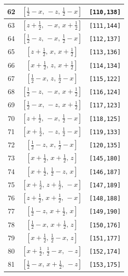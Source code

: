 \documentclass[fleqn,8pt]{jsarticle}
\begin{document}
\begin{longtable}{ccc}
62 & $\left[ \frac{1}{2} - x,\, - z,\, \frac{1}{2} - x \right]$ & {\tt [110,138]} \\ \hline
63 & $\left[ z + \frac{1}{2},\, - x,\, x + \frac{1}{2} \right]$ & {\tt [111,144]} \\ \hline
64 & $\left[ \frac{1}{2} - z,\, - x,\, \frac{1}{2} - x \right]$ & {\tt [112,137]} \\ \hline
65 & $\left[ z + \frac{1}{2},\, x,\, x + \frac{1}{2} \right]$ & {\tt [113,136]} \\ \hline
66 & $\left[ x + \frac{1}{2},\, z,\, x + \frac{1}{2} \right]$ & {\tt [114,134]} \\ \hline
67 & $\left[ \frac{1}{2} - x,\, z,\, \frac{1}{2} - x \right]$ & {\tt [115,122]} \\ \hline
68 & $\left[ \frac{1}{2} - z,\, - x,\, x + \frac{1}{2} \right]$ & {\tt [116,124]} \\ \hline
69 & $\left[ \frac{1}{2} - x,\, - z,\, x + \frac{1}{2} \right]$ & {\tt [117,123]} \\ \hline
70 & $\left[ z + \frac{1}{2},\, - x,\, \frac{1}{2} - x \right]$ & {\tt [118,125]} \\ \hline
71 & $\left[ x + \frac{1}{2},\, - z,\, \frac{1}{2} - x \right]$ & {\tt [119,133]} \\ \hline
72 & $\left[ \frac{1}{2} - z,\, x,\, \frac{1}{2} - x \right]$ & {\tt [120,135]} \\ \hline
73 & $\left[ x + \frac{1}{2},\, x + \frac{1}{2},\, z \right]$ & {\tt [145,180]} \\ \hline
74 & $\left[ x + \frac{1}{2},\, \frac{1}{2} - z,\, x \right]$ & {\tt [146,187]} \\ \hline
75 & $\left[ x + \frac{1}{2},\, z + \frac{1}{2},\, - x \right]$ & {\tt [147,189]} \\ \hline
76 & $\left[ z + \frac{1}{2},\, x + \frac{1}{2},\, - x \right]$ & {\tt [148,188]} \\ \hline
77 & $\left[ \frac{1}{2} - z,\, x + \frac{1}{2},\, x \right]$ & {\tt [149,190]} \\ \hline
78 & $\left[ \frac{1}{2} - x,\, x + \frac{1}{2},\, z \right]$ & {\tt [150,176]} \\ \hline
79 & $\left[ x + \frac{1}{2},\, \frac{1}{2} - x,\, z \right]$ & {\tt [151,177]} \\ \hline
80 & $\left[ x + \frac{1}{2},\, \frac{1}{2} - x,\, - z \right]$ & {\tt [152,174]} \\ \hline
81 & $\left[ \frac{1}{2} - x,\, x + \frac{1}{2},\, - z \right]$ & {\tt [153,175]} \\ \hline

\end{longtable}
\end{document}
